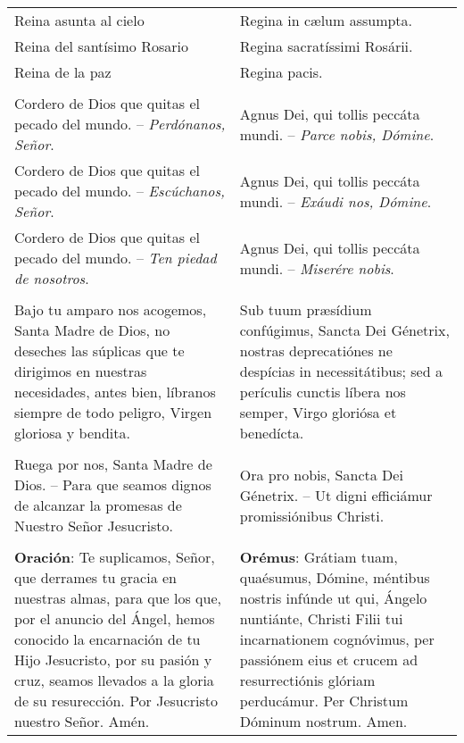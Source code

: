 \documentclass[./rosary.tex]{subfiles}
\begin{document}
\begin{longtable} { p{} p{} }
    Reina asunta al cielo & Regina in cælum assumpta.\\
    Reina del santísimo Rosario & Regina sa­cra­tíssimi Rosárii.\\
    Reina de la paz & Regina pacis.\\\\
    Cordero de Dios que quitas el pecado del mundo. -- \emph{Perdónanos, Señor}.
        &
    Agnus Dei, qui tollis peccáta mundi. -- \emph{Parce nobis, Dómine}.\\
    Cordero de Dios que quitas el pecado del mundo. -- \emph{Escúchanos, Señor}.
        &
    Agnus Dei, qui tollis peccáta mundi. -- \emph{Exáudi nos, Dómine}.\\
    Cordero de Dios que quitas el pecado del mundo. -- \emph{Ten piedad de nosotros}.
        &
    Agnus Dei, qui tollis peccáta mundi. -- \emph{Miserére nobis}.\\\\
    Bajo tu amparo nos acogemos, Santa Madre de Dios, no deseches las súplicas que te dirigimos en nuestras necesidades, antes bien,
    líbranos siempre de todo peligro, Virgen gloriosa y bendita.
        &
    Sub tuum præsídium confúgimus, Sancta Dei Génetrix, nostras de­pre­ca­tiónes ne despícias in ne­ces­si­tátibus; 
    sed a perículis cunctis líbera nos semper, Virgo gloriósa et benedícta.\\\\
    Ruega por nos, Santa Madre de Dios. -- Para que seamos dignos de alcanzar la promesas de Nuestro Señor Jesucristo.
        &
    Ora pro nobis, Sancta Dei Génetrix. -- Ut digni efficiámur pro­mi­ssiónibus Christi.\\\\

    \textbf{Oración}: Te suplicamos, Señor, que derrames tu gracia en nuestras almas, para que los que, por el anuncio del Ángel, hemos conocido
    la encarnación de tu Hijo Jesucristo, por su pasión y cruz, seamos llevados a la gloria de su resurección. Por Jesucristo nuestro Señor. Amén.
        &
    \textbf{Orémus}: Grátiam tuam, quaésumus, Dómine, méntibus nostris infúnde ut qui, Ángelo nuntiánte, Christi Filii tui incarnationem cognóvimus,
    per passiónem eius et crucem ad resurrectiónis glóriam perducámur. Per Christum Dóminum nostrum. Amen.
\end{longtable}
\end{document}
